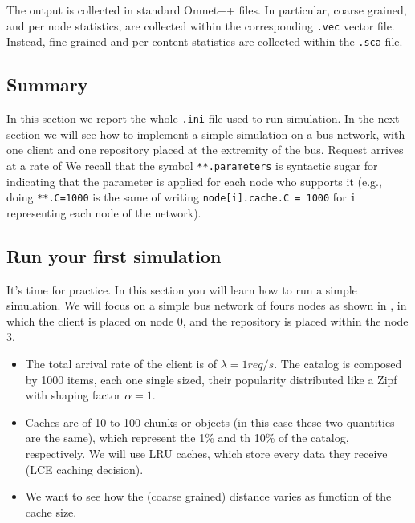 \documentclass{article}
\begin{document}
The output is collected in standard Omnet++ files. In particular, coarse grained, and per node statistics, are collected within the corresponding \verb|.vec| vector file. Instead, fine grained and per content statistics are collected within the \verb|.sca| file. 


\subsection{Summary}
In this section we report the whole \verb|.ini| file used to run simulation. In the next section we will see how to implement a simple simulation on a bus network, with one client and one repository placed at the extremity of the bus. Request arrives at a rate of We recall that the symbol \verb|**.parameters| is syntactic sugar for indicating that the parameter is applied for each node who supports it (e.g., doing \verb|**.C=1000| is the same of writing \verb|node[i].cache.C = 1000| for \verb|i| representing each node of the network). 

\subsection{Run your first simulation}
It's time for practice. In this section you will learn how to run a simple simulation. We will focus on a simple bus network of fours nodes as shown in , in which the client is placed on node 0, and the repository is placed within the node 3.

\begin{itemize}
    \item The total arrival rate of the client is of $\lambda=1req/s$. The catalog is composed by 1000 items, each one single sized, their popularity distributed like a Zipf with shaping factor $\alpha=1$. 
    \item Caches are of 10 to 100 chunks or objects (in this case these two quantities are the same), which represent the 1\% and th 10\% of the catalog, respectively. We will use LRU caches, which store every data they receive (LCE caching decision). 
    \item We want to see how the (coarse grained) distance varies as function of the cache size. 
\end{itemize}
\end{document}
